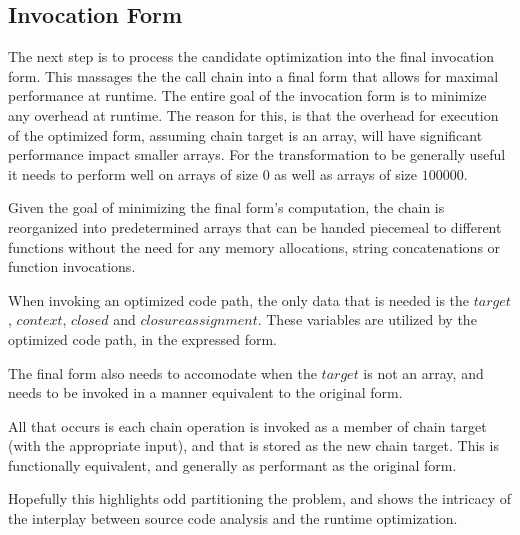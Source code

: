 \subsection{Invocation Form}
The next step is to process the candidate optimization into the final invocation form.  This massages the the call chain into a final form that allows for maximal performance at runtime.  The entire goal of the invocation form is to minimize any overhead at runtime.  The reason for this, is that the overhead for execution of the optimized form, assuming chain target is an array, will have significant performance impact smaller arrays.  For the transformation to be generally useful it needs to perform well on arrays of size $0$ as well as arrays of size $100000$.  

\begin{minipage}{\linewidth}

\end{minipage}

Given the goal of minimizing the final form's computation, the chain is reorganized into predetermined arrays that can be handed piecemeal to different functions without the need for any memory allocations, string concatenations or function invocations.

When invoking an optimized code path, the only data that is needed is the $target$, $context$, $closed$ and $closure assignment$.  These variables are utilized by the optimized code path, in the expressed form. 

The final form also needs to accomodate when the $target$ is not an array, and needs to be invoked in a manner equivalent to the original form.  \\

\begin{minipage}{\linewidth}

\end{minipage}

All that occurs is each chain operation is invoked as a member of chain target (with the appropriate input), and that is stored as the new chain target.  This is functionally equivalent, and generally as performant as the original form. %




Hopefully this highlights odd partitioning the problem, and shows the intricacy of the interplay between source code analysis and the runtime optimization.  